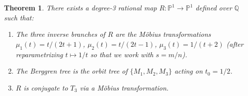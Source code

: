 \documentclass[12pt]{amsart}
\newtheorem{theorem}{Theorem}[section]
\theoremstyle{definition}
\theoremstyle{remark}
\newcommand{\QQ}{\mathbb{Q}}
\newcommand{\PP}{\mathbb{P}}
\begin{document}
\begin{theorem}\label{thm:berggren-belyi}
There exists a degree-3 rational map $R\colon\PP^1\to\PP^1$ defined
over $\QQ$ such that:
\begin{enumerate}[label=(\roman*)]
  \item The three inverse branches of $R$ are the M\"obius transformations
        $\mu_1(t) = t/(2t+1)$, $\mu_2(t) = t/(2t-1)$, $\mu_3(t)=1/(t+2)$
        (after reparametrizing $t\mapsto 1/t$ so that we work with $s=m/n$).
  \item The Berggren tree is the orbit tree of $\{M_1,M_2,M_3\}$ acting on $t_0=1/2$.
  \item $R$ is conjugate to $T_3$ via a M\"obius transformation.
\end{enumerate}
\end{theorem}
\end{document}
